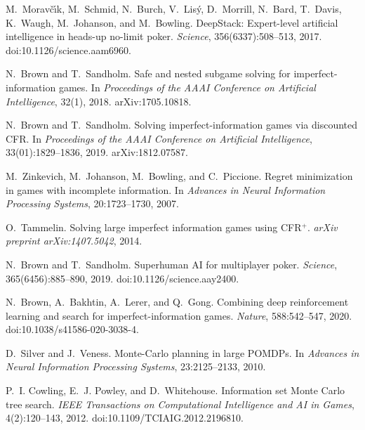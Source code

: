\documentclass[10pt]{article}
\newcommand{\1}{\mathbf{1}}
\theoremstyle{plain}
\begin{document}
\small
\begin{thebibliography}{99}

M.~Morav\v{c}\'{\i}k, M.~Schmid, N.~Burch, V.~Lis\'{y}, D.~Morrill, N.~Bard, T.~Davis, K.~Waugh, M.~Johanson, and M.~Bowling.
\newblock DeepStack: Expert-level artificial intelligence in heads-up no-limit poker.
\newblock \emph{Science}, 356(6337):508--513, 2017.
\newblock doi:10.1126/science.aam6960.

N.~Brown and T.~Sandholm.
\newblock Safe and nested subgame solving for imperfect-information games.
\newblock In \emph{Proceedings of the AAAI Conference on Artificial Intelligence}, 32(1), 2018.
\newblock arXiv:1705.10818.

N.~Brown and T.~Sandholm.
\newblock Solving imperfect-information games via discounted CFR.
\newblock In \emph{Proceedings of the AAAI Conference on Artificial Intelligence}, 33(01):1829--1836, 2019.
\newblock arXiv:1812.07587.

M.~Zinkevich, M.~Johanson, M.~Bowling, and C.~Piccione.
\newblock Regret minimization in games with incomplete information.
\newblock In \emph{Advances in Neural Information Processing Systems}, 20:1723--1730, 2007.

O.~Tammelin.
\newblock Solving large imperfect information games using CFR$^+$.
\newblock \emph{arXiv preprint arXiv:1407.5042}, 2014.

N.~Brown and T.~Sandholm.
\newblock Superhuman AI for multiplayer poker.
\newblock \emph{Science}, 365(6456):885--890, 2019.
\newblock doi:10.1126/science.aay2400.

N.~Brown, A.~Bakhtin, A.~Lerer, and Q.~Gong.
\newblock Combining deep reinforcement learning and search for imperfect-information games.
\newblock \emph{Nature}, 588:542--547, 2020.
\newblock doi:10.1038/s41586-020-3038-4.

D.~Silver and J.~Veness.
\newblock Monte-Carlo planning in large POMDPs.
\newblock In \emph{Advances in Neural Information Processing Systems}, 23:2125--2133, 2010.

P.~I. Cowling, E.~J. Powley, and D.~Whitehouse.
\newblock Information set Monte Carlo tree search.
\newblock \emph{IEEE Transactions on Computational Intelligence and AI in Games}, 4(2):120--143, 2012.
\newblock doi:10.1109/TCIAIG.2012.2196810.


\end{thebibliography}
\end{document}
